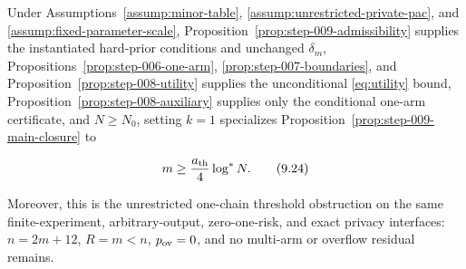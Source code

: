 \begin{proposition}
\label{prop:step-009-one-arm}
Under Assumptions~\ref{assump:minor-table},
\ref{assump:unrestricted-private-pac}, and
\ref{assump:fixed-parameter-scale},
Proposition~\ref{prop:step-009-admissibility} supplies the instantiated
hard-prior conditions and unchanged \(\delta_m\),
Propositions~\ref{prop:step-006-one-arm},
\ref{prop:step-007-boundaries}, and
Proposition~\ref{prop:step-008-utility} supplies the unconditional \eqref{eq:utility}
bound, Proposition~\ref{prop:step-008-auxiliary} supplies only the
conditional one-arm certificate, and \(N\ge N_0\), setting \(k=1\)
specializes Proposition~\ref{prop:step-009-main-closure} to

\[
m\ge\frac{a_{\rm th}}4\log^*N.
\tag{9.24}\label{eq:step-009-9-24}
\]

Moreover, this is the unrestricted one-chain threshold obstruction on
the same finite-experiment, arbitrary-output, zero-one-risk, and exact
privacy interfaces: \(n=2m+12\), \(R=m<n\), \(p_{\rm ov}=0\), and no
multi-arm or overflow residual remains.

\end{proposition}

